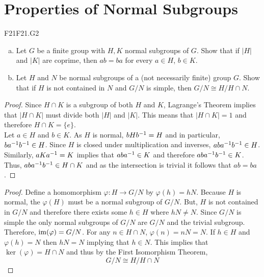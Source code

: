 \documentclass[../AlgebraQualSolutions.tex]{subfiles}
\begin{document}
\section{Properties of Normal Subgroups}

	\begin{prob}{F21}{F21.G2}
	\begin{enumerate}[(a)]
	\item Let $G$ be a finite group with $H,K$ normal subgroups of $G$. Show that if $|H|$ and $|K|$ are coprime, then $ab = ba$ for every $a \in H$, $b \in K$.
	\item Let $H$ and $N$ be normal subgroups of a (not necessarily finite) group $G$. Show that if $H$ is not contained in $N$ and $G/N$ is simple, then $G/N \cong H/H\cap N$.
	\end{enumerate}
	\end{prob}
	
	\begin{proof}
	Since  $H \cap K$ is a subgroup of both $H$ and $K$, Lagrange's Theorem implies that $|H \cap K|$ must divide both $|H|$ and $|K|$. This means that $|H \cap K| =1$ and therefore $H \cap K = \{e\}$.\\
	
	Let $a \in H$ and $b \in K$. As $H$ is normal, $bHb^{-1} = H$ and in particular, $ba^{-1} b^{-1} \in H$. Since $H$ is closed under multiplication and inverses, $aba^{-1} b^{-1} \in H$. Similarly, $aK a^{-1} = K$ implies that $aba^{-1} \in K$ and therefore $aba^{-1} b^{-1} \in K$. Thus, $aba^{-1} b^{-1} \in H \cap K$ and as the intersection is trivial it follows that $ab =ba$.
	\end{proof}
	
	\begin{proof}
	Define a homomorphism $\varphi: H \to G/N$ by $\varphi(h) = hN$. Because $H$ is normal, the $\varphi(H)$ must be a normal subgroup of $G/N$. But, $H$ is not contained in $G/N$ and therefore there exists some $h\in H$ where $hN \neq N$. Since $G/N$ is simple the only normal subgroups of $G/N$ are $G/N$ and the trivial subgroup. Therefore, $\mathrm{im}(\varphi) = G/N$. For any $n \in H \cap N$, $\varphi(n) = nN = N$. If $h \in H$ and $\varphi(h) = N$ then $hN = N$ implying that $h \in N$. This implies that $\ker(\varphi) = H\cap N$ and thus by the First Isomorphism Theorem,
		\[G/N \cong H/H\cap N\]
	\end{proof}
\end{document}
